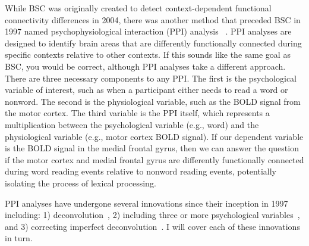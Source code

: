 \documentclass[phd,figures,tables,ackpage,abstractpage,publicabstractpage]{uithesis}
\begin{document}
While BSC was originally created to detect context-dependent functional connectivity
differences in 2004, there was another method
that preceded BSC in 1997 named psychophysiological
interaction (PPI) analysis ~\cite{Friston1997}. 
PPI analyses are designed to identify brain areas that are differently functionally connected
during specific contexts relative to other contexts.
If this sounds like the same goal as BSC, you would be correct, although PPI
analyses take a different approach.
There are three necessary components to any PPI.
The first is the psychological variable of interest, such as when a participant
either needs to read a word or nonword.
The second is the physiological variable, such as the BOLD signal from
the motor cortex.
The third variable is the PPI itself, which represents a multiplication
between the psychological variable (e.g., word)
and the physiological variable (e.g., motor cortex BOLD signal).
If our dependent variable is the BOLD signal in the medial frontal gyrus,
then we can answer the question if the motor cortex and medial frontal gyrus
are differently functionally connected during word reading events relative
to nonword reading events, potentially isolating the process of
lexical processing.

PPI analyses have undergone several innovations since their inception in 1997 including:
1) deconvolution~\cite{Gitelman2003}, 2) including three or more 
psychological variables~\cite{McLaren2012}, and 3) correcting 
imperfect deconvolution~\cite{Di2017}.
I will cover each of these innovations in turn.
\end{document}
